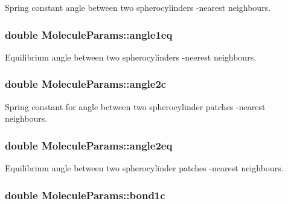 Spring constant angle between two spherocylinders -\/nearest neighbours. 

\hypertarget{class_molecule_params_aa3a3e60ad09927ad74fce4eb8dbd2a91}{
\subsubsection[{angle1eq}]{\setlength{\rightskip}{0pt plus 5cm}double Molecule\+Params\+::angle1eq}}\label{class_molecule_params_aa3a3e60ad09927ad74fce4eb8dbd2a91}


Equilibrium angle between two spherocylinders -\/neerest neighbours. 

\hypertarget{class_molecule_params_ac5666492fbac2859faf78bd7c5a1afc7}{
\subsubsection[{angle2c}]{\setlength{\rightskip}{0pt plus 5cm}double Molecule\+Params\+::angle2c}}\label{class_molecule_params_ac5666492fbac2859faf78bd7c5a1afc7}


Spring constant for angle between two spherocylinder patches -\/nearest neighbours. 

\hypertarget{class_molecule_params_aba6d4b6e5b9ee2d21f42046d2035b707}{
\subsubsection[{angle2eq}]{\setlength{\rightskip}{0pt plus 5cm}double Molecule\+Params\+::angle2eq}}\label{class_molecule_params_aba6d4b6e5b9ee2d21f42046d2035b707}


Equilibrium angle between two spherocylinder patches -\/nearest neighbours. 

\hypertarget{class_molecule_params_a48d2ea6681c8eb398d74610cffab8594}{
\subsubsection[{bond1c}]{\setlength{\rightskip}{0pt plus 5cm}double Molecule\+Params\+::bond1c}}\label{class_molecule_params_a48d2ea6681c8eb398d74610cffab8594}


